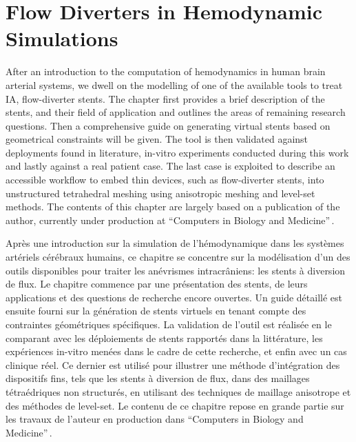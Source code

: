 \setlength{\headheight}{15pt}
\newpage
\pagestyle{fancy}

\chapter{Flow Diverters in Hemodynamic Simulations}
\minitoc\newpage\label{chap.4}

\begin{tcolorbox}[abstract]

	After an introduction to the computation of hemodynamics in human brain arterial systems, we dwell on the modelling of one of the available tools to treat IA, flow-diverter stents. The chapter first provides a brief description of the stents, and their field of application and outlines the areas of remaining research questions. Then a comprehensive guide on generating virtual stents based on geometrical constraints will be given. The tool is then validated against deployments found in literature, in-vitro experiments conducted during this work and lastly against a real patient case. The last case is exploited to describe an accessible workflow to embed thin devices, such as flow-diverter stents, into unstructured tetrahedral meshing using anisotropic meshing and level-set methods. The contents of this chapter are largely based on a publication of the author, currently under production at ``Computers in Biology and Medicine''\,\cite{Jeken-Rico2024}.

	\tcblower

	Après une introduction sur la simulation de l'hémodynamique dans les systèmes artériels cérébraux humains, ce chapitre se concentre sur la modélisation d'un des outils disponibles pour traiter les anévrismes intracrâniens: les stents à diversion de flux. Le chapitre commence par une présentation des stents, de leurs applications et des questions de recherche encore ouvertes. Un guide détaillé est ensuite fourni sur la génération de stents virtuels en tenant compte des contraintes géométriques spécifiques. La validation de l'outil est réalisée en le comparant avec les déploiements de stents rapportés dans la littérature, les expériences in-vitro menées dans le cadre de cette recherche, et enfin avec un cas clinique réel. Ce dernier est utilisé pour illustrer une méthode d'intégration des dispositifs fins, tels que les stents à diversion de flux, dans des maillages tétraédriques non structurés, en utilisant des techniques de maillage anisotrope et des méthodes de level-set. Le contenu de ce chapitre repose en grande partie sur les travaux de l'auteur en production dans ``Computers in Biology and Medicine''\,\cite{Jeken-Rico2024}.

\end{tcolorbox}

